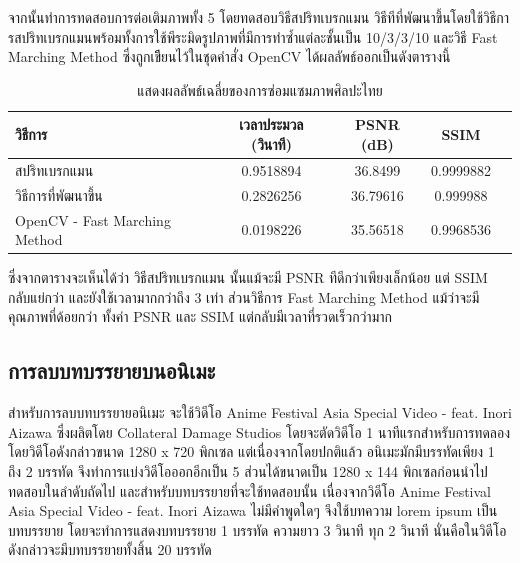 \documentclass[hidelinks, a4paper,12pt]{article}
\numberwithin{equation}{section}							%
\numberwithin{equation}{section}
\begin{document}
{	 \hspace{1cm}  จากนั้นทำการทดสอบการต่อเติมภาพทั้ง 5 โดยทดสอบวิธีสปริทเบรกแมน วิธีทีที่พัฒนาขึ้นโดยใช้วิธีการสปริทเบรกแมนพร้อมทั้งการใช้พีระมิดรูปภาพที่มีการทำซ้ำแต่ละชั้นเป็น 10/3/3/10 และวิธี Fast Marching Method ซึ่งถูกเขีียนไว้ในชุดคำสั่ง OpenCV ได้ผลลัพธ์ออกเป็นดังตารางนี้

	\begin{table}[H]
		\centering
		\begin{tabular}[ht]{|l|c|c|c|c|}
			\hline
			วิธีการ  & เวลาประมวล  (วินาที) & PSNR (dB) & SSIM \\
			\hline
			สปริทเบรกแมน & 0.9518894 & 36.8499 & 0.9999882 \\ 
			วิธีการที่พัฒนาขึ้น & 0.2826256 & 36.79616 & 0.999988 \\
			OpenCV - Fast Marching Method & 0.0198226 & 35.56518 & 0.9968536 \\
			\hline
		\end{tabular}
		\caption{แสดงผลลัพธ์เฉลี่ยของการซ่อมแซมภาพศิลปะไทย}
	\end{table}	
	\hspace{1cm} ซึ่งจากตารางจะเห็นได้ว่า วิธีสปริทเบรกแมน นั้นแม้จะมี PSNR ทีดีกว่าเพียงเล็กน้อย แต่ SSIM กลับแย่กว่า และยังใช้เวลามากกว่าถึง 3 เท่า ส่วนวิธีการ Fast Marching Method แม้ว่าจะมีคุณภาพที่ด้อยกว่า ทั้งค่า PSNR และ SSIM แต่กลับมีเวลาที่รวดเร็วกว่ามาก
	
	
	
	\subsection{การลบบทบรรยายบนอนิเมะ}
	\hspace{1cm} สำหรับการลบบทบรรยายอนิเมะ จะใช้วิดีโอ Anime Festival Asia Special Video - feat. Inori Aizawa ซึ่งผลิตโดย Collateral Damage Studios โดยจะตัดวิดีโอ 1 นาทีแรกสำหรับการทดลอง โดยวิดีโอดังกล่าวขนาด 1280 x 720 พิกเซล แต่เนื่องจากโดยปกติแล้ว อนิเมะมักมีบรรทัดเพียง 1 ถึง 2 บรรทัด จึงทำการแบ่งวิดีโอออกอีกเป็น 5 ส่วนได้ขนาดเป็น 1280 x 144 พิกเซลก่อนนำไปทดสอบในลำดับถัดไป
	\hspace{1cm} และสำหรับบทบรรยายที่จะใช้ทดสอบนั้น เนื่องจากวิดีโอ Anime Festival Asia Special Video - feat. Inori Aizawa ไม่มีคำพูดใดๆ จึงใช้บทความ lorem ipsum เป็นบทบรรยาย โดยจะทำการแสดงบทบรรยาย 1 บรรทัด ความยาว 3 วินาที ทุก 2 วินาที นั่นคือในวิดีโอดังกล่าวจะมีบทบรรยายทั้งสิ้น 20 บรรทัด	
	
}
\end{document}
